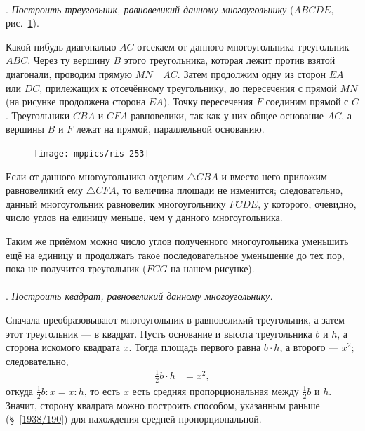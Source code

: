 \documentclass[twoside]{book}
\begin{document}
\paragraph{}\label{1938/254}
\mbox{.}
\emph{Построить треугольник, равновеликий данному многоугольнику} ($ABCDE$, рис.~\ref{1938/ris-253}).

Какой-нибудь диагональю $AC$ отсекаем от данного многоугольника треугольник $ABC$.
Через ту вершину $B$ этого треугольника, которая лежит против взятой диагонали, проводим прямую $MN\parallel AC$.
Затем продолжим одну из сторон $EA$ или $DC$, прилежащих к отсечённому треугольнику, до пересечения с прямой $MN$ (на рисунке продолжена сторона $EA$).
Точку пересечения $F$ соединим прямой с $C$.
Треугольники $CBA$ и $CFA$ равновелики, так как у них общее основание $AC$, а вершины $B$ и $F$ лежат на прямой, параллельной основанию.

\begin{figure}
\centering
\texttt{[image: mppics/ris-253]}
\caption{}\label{1938/ris-253}
\end{figure}

Если от данного многоугольника отделим $\triangle CBA$ и вместо него приложим равновеликий ему $\triangle CFA$, то величина площади не изменится;
следовательно, данный многоугольник равновелик многоугольнику $FCDE$, у которого, очевидно, число углов на единицу меньше, чем у данного многоугольника.

Таким же приёмом можно число углов полученного многоугольника уменьшить ещё на единицу и продолжать такое последовательное уменьшение до тех пор, пока не получится треугольник ($FCG$ на нашем рисунке).

\paragraph{}\label{1938/255}
.
\emph{Построить квадрат, равновеликий данному многоугольнику.}

Сначала преобразовывают многоугольник в равновеликий треугольник, а затем этот треугольник — в квадрат.
Пусть основание и высота треугольника $b$ и $h$, а сторона искомого квадрата $x$.
Тогда площадь первого равна $b\cdot h$, а второго — $x^2$; 
следовательно,
\begin{align*}
\tfrac12 b\cdot h&=x^2,
\end{align*}
откуда
$\frac12 b:{x}=x:h$,
то есть $x$ есть средняя пропорциональная между $\tfrac12 b$ и $h$.
Значит, сторону квадрата можно построить способом, указанным раньше (§~\ref{1938/190}) для нахождения средней пропорциональной.
\end{document}
